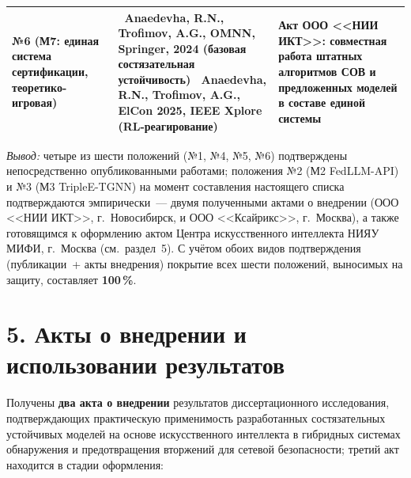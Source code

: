 \documentclass[11pt,a4paper]{article}
\begin{document}
\begin{longtable}{>{\raggedright\arraybackslash}p{} >{\raggedright\arraybackslash}p{} >{\centering\arraybackslash}p{}}
\textbf{№6} (М7: единая система сертификации, теоретико-игровая) &
[4]~Anaedevha, R.N., Trofimov, A.G., OMNN, Springer, 2024 (базовая состязательная устойчивость) \newline
[6]~Anaedevha, R.N., Trofimov, A.G., ElCon 2025, IEEE Xplore (RL-реагирование) &
Акт ООО <<НИИ ИКТ>>: совместная работа штатных алгоритмов СОВ и предложенных моделей в составе единой системы \\
\bottomrule
\end{longtable}

\textit{Вывод:} четыре из шести положений (№1, №4, №5, №6) подтверждены непосредственно опубликованными работами; положения №2 (М2 FedLLM-API) и №3 (М3 TripleE-TGNN) на момент составления настоящего списка подтверждаются эмпирически~--- двумя полученными актами о внедрении (ООО <<НИИ ИКТ>>, г.~Новосибирск, и ООО <<Ксайрикс>>, г.~Москва), а также готовящимся к оформлению актом Центра искусственного интеллекта НИЯУ МИФИ, г.~Москва (см.~раздел~5). С учётом обоих видов подтверждения (публикации~+ акты внедрения) покрытие всех шести положений, выносимых на защиту, составляет \textbf{100\,\%}.

\vspace{-0.2cm}

\section*{5. Акты о внедрении и использовании результатов}

Получены \textbf{два акта о внедрении} результатов диссертационного исследования, подтверждающих практическую применимость разработанных состязательных устойчивых моделей на основе искусственного интеллекта в гибридных системах обнаружения и предотвращения вторжений для сетевой безопасности; третий акт находится в стадии оформления:
\end{document}
